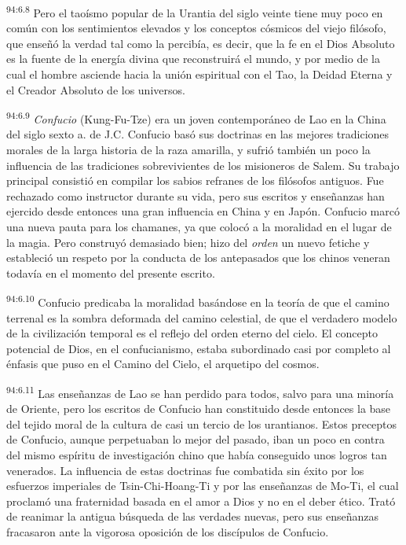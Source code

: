 \par
\textsuperscript{94:6.8} Pero el taoísmo popular de la Urantia del siglo veinte tiene muy poco en común con los sentimientos elevados y los conceptos cósmicos del viejo filósofo, que enseñó la verdad tal como la percibía, es decir, que la fe en el Dios Absoluto es la fuente de la energía divina que reconstruirá el mundo, y por medio de la cual el hombre asciende hacia la unión espiritual con el Tao, la Deidad Eterna y el Creador Absoluto de los universos.

\par
\textsuperscript{94:6.9} \textit{Confucio} (Kung-Fu-Tze) era un joven contemporáneo de Lao en la China del siglo sexto a. de J.C. Confucio basó sus doctrinas en las mejores tradiciones morales de la larga historia de la raza amarilla, y sufrió también un poco la influencia de las tradiciones sobrevivientes de los misioneros de Salem. Su trabajo principal consistió en compilar los sabios refranes de los filósofos antiguos. Fue rechazado como instructor durante su vida, pero sus escritos y enseñanzas han ejercido desde entonces una gran influencia en China y en Japón. Confucio marcó una nueva pauta para los chamanes, ya que colocó a la moralidad en el lugar de la magia. Pero construyó demasiado bien; hizo del \textit{orden} un nuevo fetiche y estableció un respeto por la conducta de los antepasados que los chinos veneran todavía en el momento del presente escrito.

\par
\textsuperscript{94:6.10} Confucio predicaba la moralidad basándose en la teoría de que el camino terrenal es la sombra deformada del camino celestial, de que el verdadero modelo de la civilización temporal es el reflejo del orden eterno del cielo. El concepto potencial de Dios, en el confucianismo, estaba subordinado casi por completo al énfasis que puso en el Camino del Cielo, el arquetipo del cosmos.

\par
\textsuperscript{94:6.11} Las enseñanzas de Lao se han perdido para todos, salvo para una minoría de Oriente, pero los escritos de Confucio han constituido desde entonces la base del tejido moral de la cultura de casi un tercio de los urantianos. Estos preceptos de Confucio, aunque perpetuaban lo mejor del pasado, iban un poco en contra del mismo espíritu de investigación chino que había conseguido unos logros tan venerados. La influencia de estas doctrinas fue combatida sin éxito por los esfuerzos imperiales de Tsin-Chi-Hoang-Ti y por las enseñanzas de Mo-Ti, el cual proclamó una fraternidad basada en el amor a Dios y no en el deber ético. Trató de reanimar la antigua búsqueda de las verdades nuevas, pero sus enseñanzas fracasaron ante la vigorosa oposición de los discípulos de Confucio.

